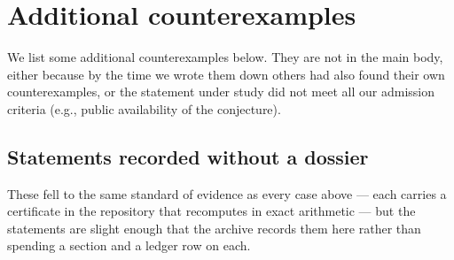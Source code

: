 %
%
\section{Additional counterexamples}
\label{sec:additional}
We list some additional counterexamples below. They are not in the main body, either because by the time we wrote them  down others had also found their own counterexamples, or the statement under study did not meet all our admission criteria (e.g., public availability of the conjecture).







\subsection{Statements recorded without a dossier}

These fell to the same standard of evidence as every case above --- each carries
a certificate in the repository that recomputes in exact arithmetic --- but the
statements are slight enough that the archive records them here rather than
spending a section and a ledger row on each.

\medskip
\begin{itemize}[itemsep=0.4em]

\end{itemize}

